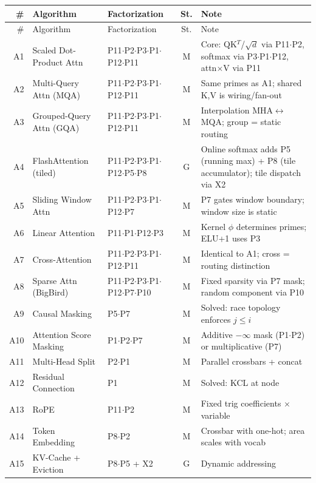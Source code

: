 \documentclass[10pt]{article}
\begin{document}
\begin{longtable}{rlp{3.0cm}cp{4.8cm}}
\toprule
\# & Algorithm & Factorization & St. & Note \\
\midrule
\endfirsthead
\toprule
\# & Algorithm & Factorization & St. & Note \\
\midrule
\endhead
\bottomrule
\endfoot
A1 & Scaled Dot-Product Attn & P11$\cdot$P2$\cdot$P3$\cdot$P1$\cdot$P12$\cdot$P11 & M & Core: QK$^T$/\(\sqrt{d}\) via P11$\cdot$P2, softmax via P3$\cdot$P1$\cdot$P12, attn$\times$V via P11 \\
A2 & Multi-Query Attn (MQA) & P11$\cdot$P2$\cdot$P3$\cdot$P1$\cdot$P12$\cdot$P11 & M & Same primes as A1; shared K,V is wiring/fan-out \\
A3 & Grouped-Query Attn (GQA) & P11$\cdot$P2$\cdot$P3$\cdot$P1$\cdot$P12$\cdot$P11 & M & Interpolation MHA$\leftrightarrow$MQA; group = static routing \\
A4 & FlashAttention (tiled) & P11$\cdot$P2$\cdot$P3$\cdot$P1$\cdot$P12$\cdot$P5$\cdot$P8 & G & Online softmax adds P5 (running max) + P8 (tile accumulator); tile dispatch via X2 \\
A5 & Sliding Window Attn & P11$\cdot$P2$\cdot$P3$\cdot$P1$\cdot$P12$\cdot$P7 & M & P7 gates window boundary; window size is static \\
A6 & Linear Attention & P11$\cdot$P1$\cdot$P12$\cdot$P3 & M & Kernel $\phi$ determines primes; ELU+1 uses P3 \\
A7 & Cross-Attention & P11$\cdot$P2$\cdot$P3$\cdot$P1$\cdot$P12$\cdot$P11 & M & Identical to A1; cross = routing distinction \\
A8 & Sparse Attn (BigBird) & P11$\cdot$P2$\cdot$P3$\cdot$P1$\cdot$P12$\cdot$P7$\cdot$P10 & M & Fixed sparsity via P7 mask; random component via P10 \\
A9 & Causal Masking & P5$\cdot$P7 & M & Solved: race topology enforces $j \leq i$ \\
A10 & Attention Score Masking & P1$\cdot$P2$\cdot$P7 & M & Additive $-\infty$ mask (P1$\cdot$P2) or multiplicative (P7) \\
A11 & Multi-Head Split & P2$\cdot$P1 & M & Parallel crossbars + concat \\
A12 & Residual Connection & P1 & M & Solved: KCL at node \\
A13 & RoPE & P11$\cdot$P2 & M & Fixed trig coefficients $\times$ variable \\
A14 & Token Embedding & P8$\cdot$P2 & M & Crossbar with one-hot; area scales with vocab \\
A15 & KV-Cache + Eviction & P8$\cdot$P5 + X2 & G & Dynamic addressing \\

\end{longtable}
\end{document}

